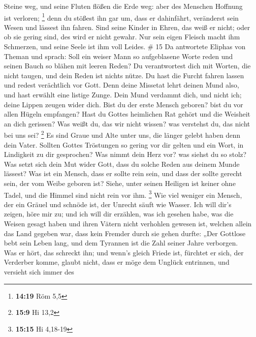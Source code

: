 Steine weg, und seine Fluten flößen die Erde weg: aber des Menschen
Hoffnung ist verloren; \footnote{\textbf{14:19} Röm 5,5} 
denn du stößest ihn gar um, dass er dahinfährt, veränderst sein Wesen
und lässest ihn fahren.  Sind seine Kinder in Ehren, das
weiß er nicht; oder ob sie gering sind, des wird er nicht gewahr.
 Nur sein eigen Fleisch macht ihm Schmerzen, und seine
Seele ist ihm voll Leides. \# 15  Da antwortete Eliphas
von Theman und sprach:  Soll ein weiser Mann so
aufgeblasene Worte reden und seinen Bauch so blähen mit leeren Reden?
 Du verantwortest dich mit Worten, die nicht taugen, und
dein Reden ist nichts nütze.  Du hast die Furcht fahren
lassen und redest verächtlich vor Gott.  Denn deine
Missetat lehrt deinen Mund also, und hast erwählt eine listige Zunge.
 Dein Mund verdammt dich, und nicht ich; deine Lippen
zeugen wider dich.  Bist du der erste Mensch geboren? bist
du vor allen Hügeln empfangen?  Hast du Gottes heimlichen
Rat gehört und die Weisheit an dich gerissen?  Was weißt
du, das wir nicht wissen? was verstehst du, das nicht bei uns sei?
\footnote{\textbf{15:9} Hi 13,2}  Es sind Graue und Alte
unter uns, die länger gelebt haben denn dein Vater. 
Sollten Gottes Tröstungen so gering vor dir gelten und ein Wort, in
Lindigkeit zu dir gesprochen?  Was nimmt dein Herz vor?
was siehst du so stolz?  Was setzt sich dein Mut wider
Gott, dass du solche Reden aus deinem Munde lässest?  Was
ist ein Mensch, dass er sollte rein sein, und dass der sollte gerecht
sein, der vom Weibe geboren ist?  Siehe, unter seinen
Heiligen ist keiner ohne Tadel, und die Himmel sind nicht rein vor ihm.
\footnote{\textbf{15:15} Hi 4,18-19}  Wie viel weniger
ein Mensch, der ein Gräuel und schnöde ist, der Unrecht säuft wie
Wasser.  Ich will dir's zeigen, höre mir zu; und ich will
dir erzählen, was ich gesehen habe,  was die Weisen
gesagt haben und ihren Vätern nicht verhohlen gewesen ist,
 welchen allein das Land gegeben war, dass kein Fremder
durch sie gehen durfte:  „Der Gottlose bebt sein Leben
lang, und dem Tyrannen ist die Zahl seiner Jahre verborgen.
 Was er hört, das schreckt ihn; und wenn's gleich Friede
ist, fürchtet er sich, der Verderber komme,  glaubt
nicht, dass er möge dem Unglück entrinnen, und versieht sich immer des

